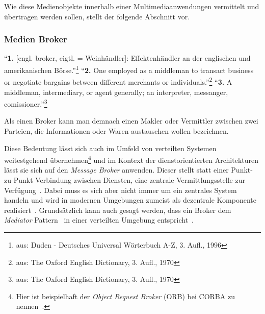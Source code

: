 
  Wie diese Medienobjekte innerhalb einer Multimediaanwendungen vermittelt und übertragen werden sollen, stellt der folgende Abschnitt vor.


\subsubsection{Medien Broker} %
\label{ssub:media_broker}

  \begin{definition}[Broker]\label{def:broker}
    "`\textbf{1.} [engl. broker, eigtl. = Weinhändler]: Effektenhändler an der englischen und amerikanischen Börse."'\footnote{aus: Duden - Deutsches Universal Wörterbuch A-Z, 3. Aufl., 1996} "`\textbf{2.} One employed as a middleman to transact business or negotiate bargains between different merchants or individuals."'\footnote{aus: The Oxford English Dictionary, 3. Aufl., 1970} "`\textbf{3.} A middleman, intermediary, or agent generally; an interpreter, messanger, comissioner."'\footnote{aus: The Oxford English Dictionary, 3. Aufl., 1970}
  \end{definition}

  Als einen Broker kann man demnach einen Makler oder Vermittler zwischen zwei Parteien, die Informationen oder Waren austauschen wollen bezeichnen.

  Diese Bedeutung lässt sich auch im Umfeld von verteilten Systemen weitestgehend übernehmen\footnote{Hier ist beispielhaft der \emph{Object Request Broker} (ORB) bei CORBA zu nennen~\citep{coulouris2001ds,balzert1999lo}.} und im Kontext der dienstorientierten Architekturen lässt sie sich auf den \emph{Message Broker} anwenden. Dieser stellt statt einer Punkt-zu-Punkt Verbindung zwischen Diensten, eine zentrale Vermittlungsstelle zur Verfügung~\citep[S. 71]{web_services}. Dabei muss es sich aber nicht immer um ein zentrales System handeln und wird in modernen Umgebungen zumeist als dezentrale Komponente realisiert~\citep{enterprise_service_bus}. Grundsätzlich kann auch gesagt werden, dass ein Broker dem \emph{Mediator} Pattern~\citep[S. 273]{design_patterns} in einer verteilten Umgebung entspricht~\citep[S. 83]{enterprise_integration_patterns}.
  
